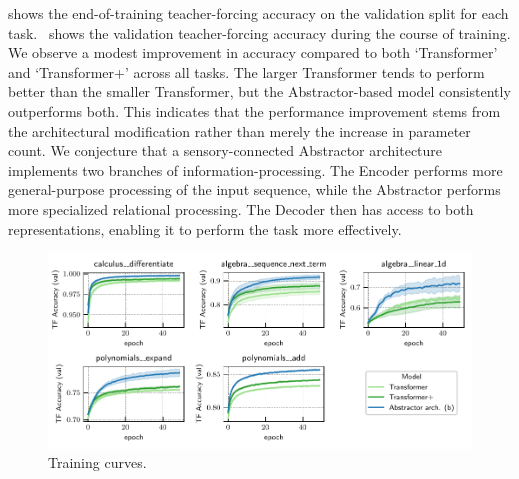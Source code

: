  shows the end-of-training teacher-forcing accuracy on the validation split for each task.~ shows the validation teacher-forcing accuracy during the course of training. We observe a modest improvement in accuracy compared to both `Transformer' and `Transformer+' across all tasks. The larger Transformer tends to perform better than the smaller Transformer, but the Abstractor-based model consistently outperforms both. This indicates that the performance improvement stems from the architectural modification rather than merely the increase in parameter count. We conjecture that a sensory-connected Abstractor architecture implements two branches of information-processing. The Encoder performs more general-purpose processing of the input sequence, while the Abstractor performs more specialized relational processing. The Decoder then has access to both representations, enabling it to perform the task more effectively.

\begin{figure}[t]
    \centering
    \includegraphics[width=\textwidth]{figures/experiments/math_training_curves.pdf}
    \caption{Training curves.}\label{fig:math_training_curves}
\end{figure}